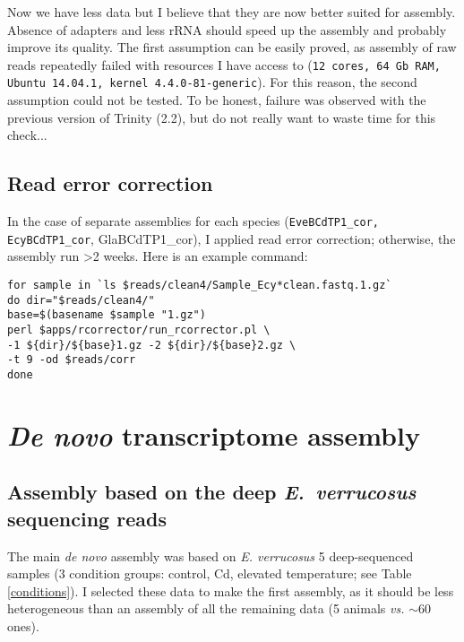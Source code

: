 \documentclass[12pt]{article}
\begin{document}
Now we have less data but I believe that they are now better suited for assembly. Absence of adapters and less rRNA should speed up the assembly and probably improve its quality. The first assumption can be easily proved, as assembly of raw reads repeatedly failed with resources I have access to (\verb|12 cores, 64 Gb RAM, Ubuntu 14.04.1, kernel 4.4.0-81-generic|). For this reason, the second assumption could not be tested. To be honest, failure was observed with the previous version of Trinity (2.2), but do not really want to waste time for this check...


\subsection{Read error correction} \label{error_correction}

In the case of separate assemblies for each species (\texttt{EveBCdTP1\_cor, EcyBCdTP1\_cor}, GlaBCdTP1\_cor), I applied read error correction; otherwise, the assembly run \textgreater 2 weeks. Here is an example command:

\begin{verbatim}
for sample in `ls $reads/clean4/Sample_Ecy*clean.fastq.1.gz`
do dir="$reads/clean4/"
base=$(basename $sample "1.gz")
perl $apps/rcorrector/run_rcorrector.pl \
-1 ${dir}/${base}1.gz -2 ${dir}/${base}2.gz \
-t 9 -od $reads/corr
done

\end{verbatim}



\section{\textit{De novo} transcriptome assembly} \label{assembly}

\subsection{Assembly based on the deep \textit{E.~verrucosus} sequencing reads}

	The main \textit{de novo} assembly was based on \textit{E. verrucosus} 5 deep-sequenced samples (3 condition groups: control, Cd, elevated temperature; see Table \ref{conditions}). I selected these data to make the first assembly, as it should be less heterogeneous than an assembly of all the remaining data (5 animals \textit{vs.} $\sim$60 ones). 
				
\end{document}
